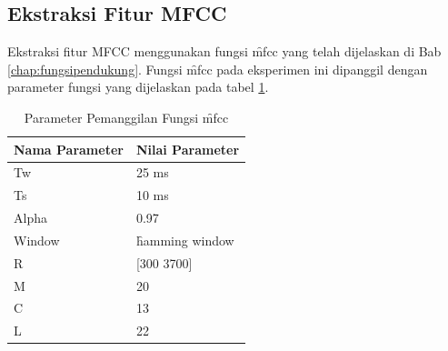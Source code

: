 \subsection{Ekstraksi Fitur MFCC} \label{chap:ekstrak fitur mfcc}
Ekstraksi fitur MFCC menggunakan fungsi \f{mfcc} yang telah dijelaskan di Bab \ref{chap:fungsipendukung}. Fungsi \f{mfcc} pada eksperimen ini dipanggil dengan parameter fungsi yang dijelaskan pada tabel \ref{table:pemanggilanmfcc}.
\begin{table}
	\centering
  \caption{Parameter Pemanggilan Fungsi \f{mfcc}}
  \begin{tabular}{|l|l|}
    \hline
    \textbf{Nama Parameter} & \textbf{Nilai Parameter} \\ \hline
    Tw & 25 ms \\ \hline
    Ts & 10 ms \\ \hline
    Alpha & 0.97 \\ \hline
    Window & \f{hamming window}  \\ \hline
    R & [300 3700] \\ \hline
    M & 20 \\ \hline
    C & 13 \\ \hline
    L & 22 \\ \hline
  \end{tabular}
  \label{table:pemanggilanmfcc}
 \end{table}

